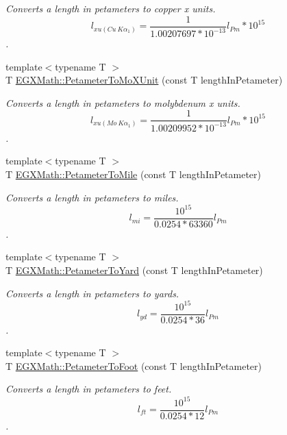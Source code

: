 \begin{DoxyCompactItemize}
\begin{DoxyCompactList}\small\item\em Converts a length in petameters to copper x units. \[ l_{xu(Cu\ K\alpha_1)}= \frac{1}{1.00207697*10^{-13}} l_{Pm} * 10^{15}\]. \end{DoxyCompactList}\item 
{\footnotesize template$<$typename T $>$ }\\T \mbox{\hyperlink{group___e_g_x_math-_conversions-_length_conversions-_s_i-_petameter-_non-_s_i_ga29419ba09bb33a7bc9e23f8cde2efea3}{E\+G\+X\+Math\+::\+Petameter\+To\+Mo\+X\+Unit}} (const T length\+In\+Petameter)
\begin{DoxyCompactList}\small\item\em Converts a length in petameters to molybdenum x units. \[ l_{xu(Mo\ K\alpha_1)}=\frac{1}{1.00209952*10^{-13}} l_{Pm} * 10^{15}\]. \end{DoxyCompactList}\item 
{\footnotesize template$<$typename T $>$ }\\T \mbox{\hyperlink{group___e_g_x_math-_conversions-_length_conversions-_s_i-_petameter-_imperial_ga3aa40ba19c1425ed3473c605cf7d4478}{E\+G\+X\+Math\+::\+Petameter\+To\+Mile}} (const T length\+In\+Petameter)
\begin{DoxyCompactList}\small\item\em Converts a length in petameters to miles. \[ l_{mi}=\frac{10^{15}}{0.0254 * 63360} l_{Pm} \]. \end{DoxyCompactList}\item 
{\footnotesize template$<$typename T $>$ }\\T \mbox{\hyperlink{group___e_g_x_math-_conversions-_length_conversions-_s_i-_petameter-_imperial_gadd453d20eef89db280c71397046d5dcd}{E\+G\+X\+Math\+::\+Petameter\+To\+Yard}} (const T length\+In\+Petameter)
\begin{DoxyCompactList}\small\item\em Converts a length in petameters to yards. \[ l_{yd}= \frac{10^{15}}{0.0254 * 36} l_{Pm} \]. \end{DoxyCompactList}\item 
{\footnotesize template$<$typename T $>$ }\\T \mbox{\hyperlink{group___e_g_x_math-_conversions-_length_conversions-_s_i-_petameter-_imperial_gab1b79668a9de6a8374601bb44dde250d}{E\+G\+X\+Math\+::\+Petameter\+To\+Foot}} (const T length\+In\+Petameter)
\begin{DoxyCompactList}\small\item\em Converts a length in petameters to feet. \[ l_{ft}= \frac{10^{15}}{0.0254 * 12} l_{Pm} \]. \end{DoxyCompactList}\item 

\end{DoxyCompactItemize}
